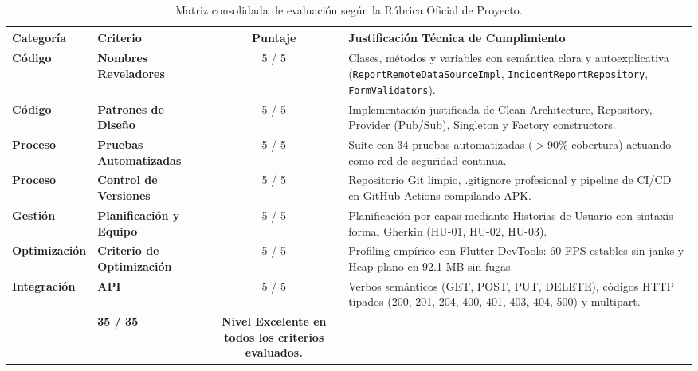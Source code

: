 \documentclass[12pt,a4paper]{article}
\begin{document}
\begin{table}[H]
\centering
\small
\begin{tabularx}{\textwidth}{p{2.2cm} p{3.2cm} c X}
\toprule
\rowcolor{tableHeader}
\textbf{Categoría} & \textbf{Criterio} & \textbf{Puntaje} & \textbf{Justificación Técnica de Cumplimiento} \\
\midrule
\textbf{Código} & \textbf{Nombres Reveladores} & 5 / 5 & Clases, métodos y variables con semántica clara y autoexplicativa (\texttt{ReportRemoteDataSourceImpl}, \texttt{IncidentReportRepository}, \texttt{FormValidators}). \\
\rowcolor{tableStripe}
\textbf{Código} & \textbf{Patrones de Diseño} & 5 / 5 & Implementación justificada de Clean Architecture, Repository, Provider (Pub/Sub), Singleton y Factory constructors. \\
\textbf{Proceso} & \textbf{Pruebas Automatizadas} & 5 / 5 & Suite con 34 pruebas automatizadas ($>$90\% cobertura) actuando como red de seguridad continua. \\
\rowcolor{tableStripe}
\textbf{Proceso} & \textbf{Control de Versiones} & 5 / 5 & Repositorio Git limpio, .gitignore profesional y pipeline de CI/CD en GitHub Actions compilando APK. \\
\textbf{Gestión} & \textbf{Planificación y Equipo} & 5 / 5 & Planificación por capas mediante Historias de Usuario con sintaxis formal Gherkin (HU-01, HU-02, HU-03). \\
\rowcolor{tableStripe}
\textbf{Optimización} & \textbf{Criterio de Optimización} & 5 / 5 & Profiling empírico con Flutter DevTools: 60 FPS estables sin janks y Heap plano en 92.1 MB sin fugas. \\
\textbf{Integración} & \textbf{API} & 5 / 5 & Verbos semánticos (GET, POST, PUT, DELETE), códigos HTTP tipados (200, 201, 204, 400, 401, 403, 404, 500) y multipart. \\
\midrule
\rowcolor{tableHeader}
\multicolumn{2}{l}{\textbf{CALIFICACIÓN FINAL ESTIMADA}} & \textbf{35 / 35} & \textbf{Nivel Excelente en todos los criterios evaluados.} \\
\bottomrule
\end{tabularx}
\caption{Matriz consolidada de evaluación según la Rúbrica Oficial de Proyecto.}
\label{tab:rubrica_consolidada}
\end{table}

\end{document}
